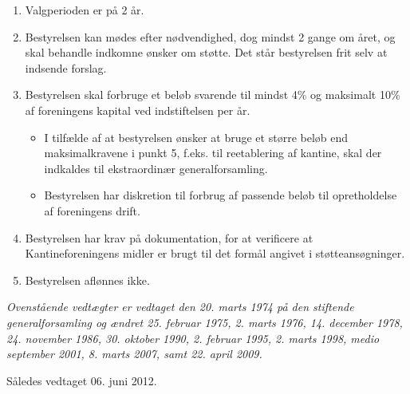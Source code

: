 \documentclass[a4paper, 10pt]{article}
\begin{document}
\begin{enumerate}
\item Valgperioden er på 2 år.

\item Bestyrelsen kan mødes efter nødvendighed, dog mindst 2 gange om
året, og skal behandle indkomne ønsker om støtte. Det står bestyrelsen
frit selv at indsende forslag.

\item Bestyrelsen skal forbruge et beløb svarende til mindst 4\% og
maksimalt 10\% af foreningens kapital ved indstiftelsen per år.

\begin{itemize}

\item I tilfælde af at bestyrelsen ønsker at bruge et større beløb end
maksimalkravene i punkt 5, f.eks. til reetablering af kantine, skal
der indkaldes til ekstraordinær generalforsamling.

\item Bestyrelsen har diskretion til forbrug af passende beløb til
opretholdelse af for\-eningens drift.

\end{itemize}

\item Bestyrelsen har krav på dokumentation, for at verificere at
Kantineforeningens midler er brugt til det formål angivet i
støtteansøgninger.

\item Bestyrelsen aflønnes ikke.

\end{enumerate}

\vspace{\fill}

\noindent \emph{Ovenstående vedtægter er vedtaget den 20. marts 1974
på den stiftende generalforsamling og ændret 25.  februar 1975, 2.
marts 1976, 14. december 1978, 24. november 1986, 30.  oktober 1990,
2.  februar 1995, 2. marts 1998, medio september 2001, 8. marts 2007,
samt 22. april 2009.}

\bigskip

\noindent Således vedtaget 06. juni 2012.
\end{document}
